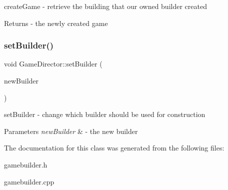 create\+Game -\/ retrieve the building that our owned builder created 

\begin{DoxyReturn}{Returns}
-\/ the newly created game 
\end{DoxyReturn}
\mbox{\label{class_game_director_af849b0b8309680e7eb53cc1803895aab}} 
\subsubsection{\texorpdfstring{set\+Builder()}{setBuilder()}}
{\footnotesize\ttfamily void Game\+Director\+::set\+Builder (\begin{DoxyParamCaption}\item[{\mbox{\hyperlink{class_game_builder}{Game\+Builder}} $\ast$}]{new\+Builder }\end{DoxyParamCaption})\hspace{0.3cm}{\ttfamily [inline]}}



set\+Builder -\/ change which builder should be used for construction 


\begin{DoxyParams}{Parameters}
{\em new\+Builder} & -\/ the new builder \\
\hline
\end{DoxyParams}


The documentation for this class was generated from the following files\+:\begin{DoxyCompactItemize}
\item 
gamebuilder.\+h\item 
gamebuilder.\+cpp\end{DoxyCompactItemize}
